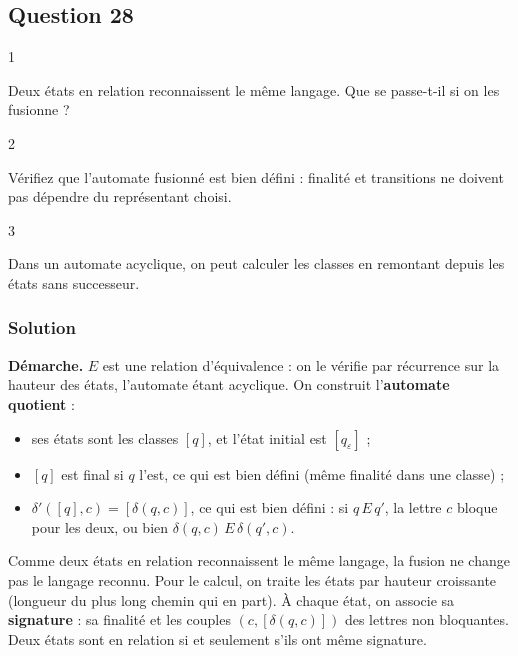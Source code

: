 \documentclass[11pt,a4paper]{article}
\providecommand{\tightlist}{\setlength{\itemsep}{0pt}\setlength{\parskip}{0pt}}
\begin{document}
\hypertarget{question-28}{%
\subsection{Question 28}\label{question-28}}

\begin{indication}{1}

Deux états en relation reconnaissent le même langage. Que se passe-t-il si on les fusionne ?

\end{indication}

\begin{indication}{2}

Vérifiez que l'automate fusionné est bien défini : finalité et transitions ne doivent pas dépendre du représentant choisi.

\end{indication}

\begin{indication}{3}

Dans un automate acyclique, on peut calculer les classes en remontant depuis les états sans successeur.

\end{indication}

\hypertarget{solution-27}{%
\subsubsection{Solution}\label{solution-27}}

\textbf{Démarche.} \(E\) est une relation d'équivalence : on le vérifie par récurrence sur la hauteur des états, l'automate étant acyclique. On construit l'\textbf{automate quotient} :

\begin{itemize}
\tightlist
\item
  ses états sont les classes \([q]\), et l'état initial est \([q_\varepsilon]\) ;
\item
  \([q]\) est final si \(q\) l'est, ce qui est bien défini (même finalité dans une classe) ;
\item
  \(\delta'([q], c) = [\delta(q, c)]\), ce qui est bien défini : si \(q\,E\,q'\), la lettre \(c\) bloque pour les deux, ou bien \(\delta(q,c)\,E\,\delta(q',c)\).
\end{itemize}

Comme deux états en relation reconnaissent le même langage, la fusion ne change pas le langage reconnu. Pour le calcul, on traite les états par hauteur croissante (longueur du plus long chemin qui en part). À chaque état, on associe sa \textbf{signature} : sa finalité et les couples \((c, [\delta(q,c)])\) des lettres non bloquantes. Deux états sont en relation si et seulement s'ils ont même signature.
\end{document}
